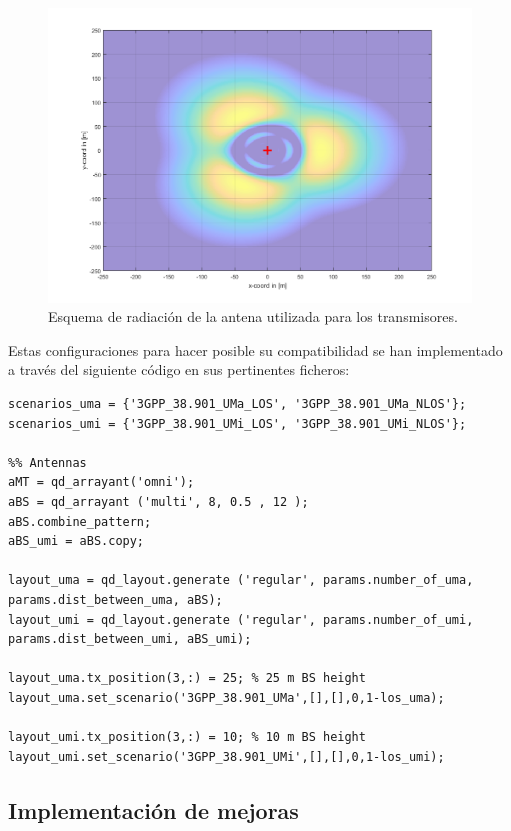\begin{figure}[h!]
	\centering
    \includegraphics[width=\linewidth]{imagenes/articulo_radiacion.png}
	\caption{Esquema de radiación de la antena utilizada para los transmisores.}
	\label{fig:radiacion}
\end{figure}

Estas configuraciones para hacer posible su compatibilidad se han implementado a través del siguiente código en sus pertinentes ficheros:

\begin{lstlisting}[style=Matlab-editor, basicstyle=\tiny]
scenarios_uma = {'3GPP_38.901_UMa_LOS', '3GPP_38.901_UMa_NLOS'};
scenarios_umi = {'3GPP_38.901_UMi_LOS', '3GPP_38.901_UMi_NLOS'};

%% Antennas
aMT = qd_arrayant('omni');
aBS = qd_arrayant ('multi', 8, 0.5 , 12 );
aBS.combine_pattern;
aBS_umi = aBS.copy;

layout_uma = qd_layout.generate ('regular', params.number_of_uma, params.dist_between_uma, aBS);
layout_umi = qd_layout.generate ('regular', params.number_of_umi, params.dist_between_umi, aBS_umi);

layout_uma.tx_position(3,:) = 25; % 25 m BS height
layout_uma.set_scenario('3GPP_38.901_UMa',[],[],0,1-los_uma);

layout_umi.tx_position(3,:) = 10; % 10 m BS height
layout_umi.set_scenario('3GPP_38.901_UMi',[],[],0,1-los_umi);
\end{lstlisting}

\subsection{Implementación de mejoras}

